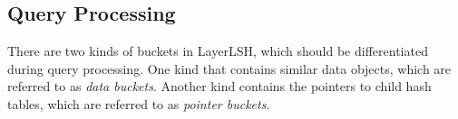 \subsection{Query Processing}
\label{sec:layerlsh:query}

There are two kinds of buckets in LayerLSH, which should be differentiated during query processing. One kind that contains similar data objects, which are referred to as \emph{data buckets}. Another kind contains the pointers to child hash tables, which are referred to as \emph{pointer buckets}.

